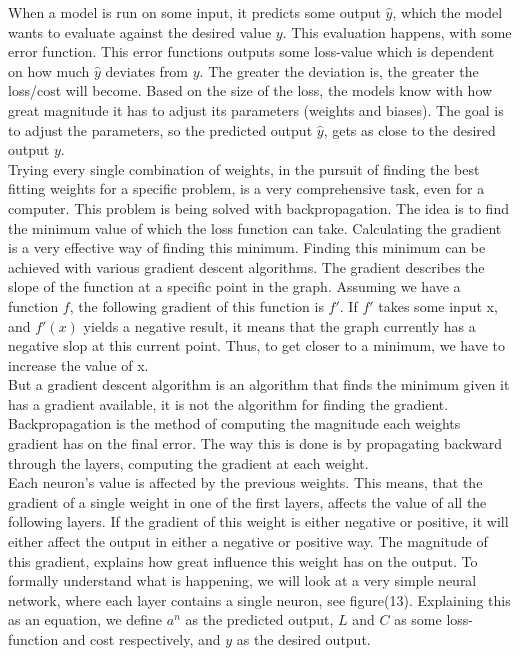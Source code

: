When a model is run on some input, it predicts some output $\hat{y}$, which the model wants to evaluate against the desired value $y$. This evaluation happens, with some error function. This error functions outputs some loss-value which is dependent on how much $\hat{y}$ deviates from $y$. The greater the deviation is, the greater the loss/cost will become.
Based on the size of the loss, the models know with how great magnitude it has to adjust its parameters (weights and biases). The goal is to adjust the parameters, so the predicted output $\hat{y}$, gets as close to the desired output $y$.\\

\noindent
Trying every single combination of weights, in the pursuit of finding the best fitting weights for a specific problem, is a very comprehensive task, even for a computer. This problem is being solved with backpropagation. The idea is to find the minimum value of which the loss function can take. Calculating the gradient is a very effective way of finding this minimum. Finding this minimum can be achieved with various gradient descent algorithms. The gradient describes the slope of the function at a specific point in the graph. Assuming we have a function $f$, the following gradient of this function is $f'$. If $f'$ takes some input x, and $f'(x)$ yields a negative result, it means that the graph currently has a negative slop at this current point. Thus, to get closer to a minimum, we have to increase the value of x. \\

\noindent
But a gradient descent algorithm is an algorithm that finds the minimum given it has a gradient available, it is not the algorithm for finding the gradient. Backpropagation is the method of computing the magnitude each weights gradient has on the final error. The way this is done is by propagating backward through the layers, computing the gradient at each weight. \\

\noindent
Each neuron's value is affected by the previous weights. This means, that the gradient of a single weight in one of the first layers, affects the value of all the following layers. If the gradient of this weight is either negative or positive, it will either affect the output in either a negative or positive way. The magnitude of this gradient, explains how great influence this weight has on the output.
To formally understand what is happening, we will look at a very simple neural network, where each layer contains a single neuron, see figure(13). Explaining this as an equation, we define $a^n$ as the predicted output, $L$ and $C$ as some loss-function and cost respectively, and $y$ as the desired output.

